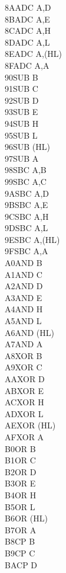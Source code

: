 \documentclass[twoside,openright,a4paper]{book}
\begin{document}
\begin{multicols}{3}
{\begin{tabbing}
	8A\>ADC A,D\\
	8B\>ADC A,E\\
	8C\>ADC A,H\\
	8D\>ADC A,L\\
	8E\>ADC A,(HL)\\
	8F\>ADC A,A\\
	90\>SUB B\\
	91\>SUB C\\
	92\>SUB D\\
	93\>SUB E\\
	94\>SUB H\\
	95\>SUB L\\
	96\>SUB (HL)\\
	97\>SUB A\\
	98\>SBC A,B\\
	99\>SBC A,C\\
	9A\>SBC A,D\\
	9B\>SBC A,E\\
	9C\>SBC A,H\\
	9D\>SBC A,L\\
	9E\>SBC A,(HL)\\
	9F\>SBC A,A\\
	A0\>AND B\\
	A1\>AND C\\
	A2\>AND D\\
	A3\>AND E\\
	A4\>AND H\\
	A5\>AND L\\
	A6\>AND (HL)\\
	A7\>AND A\\
	A8\>XOR B\\
	A9\>XOR C\\
	AA\>XOR D\\
	AB\>XOR E\\
	AC\>XOR H\\
	AD\>XOR L\\
	AE\>XOR (HL)\\
	AF\>XOR A\\
	B0\>OR B\\
	B1\>OR C\\
	B2\>OR D\\
	B3\>OR E\\
	B4\>OR H\\
	B5\>OR L\\
	B6\>OR (HL)\\
	B7\>OR A\\
	B8\>CP B\\
	B9\>CP C\\
	BA\>CP D\\

\end{tabbing}}
\end{multicols}
\end{document}
